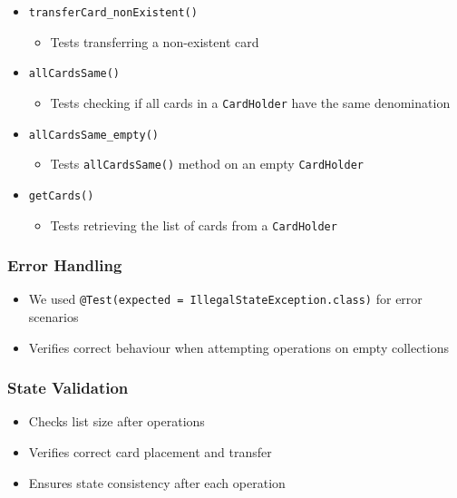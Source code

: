 \documentclass{article}
\begin{document}
\begin{itemize}
\begin{itemize}
          \end{itemize}
    \item \texttt{transferCard\_nonExistent()}
          \begin{itemize}
              \item Tests transferring a non-existent card
          \end{itemize}
    \item \texttt{allCardsSame()}
          \begin{itemize}
              \item Tests checking if all cards in a \texttt{CardHolder} have the same denomination
          \end{itemize}
    \item \texttt{allCardsSame\_empty()}
          \begin{itemize}
              \item Tests \texttt{allCardsSame()} method on an empty \texttt{CardHolder}
          \end{itemize}
    \item \texttt{getCards()}
          \begin{itemize}
              \item Tests retrieving the list of cards from a \texttt{CardHolder}
          \end{itemize}
\end{itemize}

\subsubsection{Error Handling}
\begin{itemize}
    \item We used \texttt{@Test(expected = IllegalStateException.class)} for error scenarios
    \item Verifies correct behaviour when attempting operations on empty collections
\end{itemize}

\subsubsection{State Validation}
\begin{itemize}
    \item Checks list size after operations
    \item Verifies correct card placement and transfer
    \item Ensures state consistency after each operation
\end{itemize}
\end{document}
